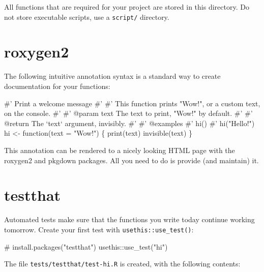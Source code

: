 \documentclass[]{book}
\newenvironment{Shaded}{}{}
\newcommand{\CommentTok}[1]{\textcolor[rgb]{0.00,0.50,0.00}{#1}}
\newcommand{\ControlFlowTok}[1]{\textcolor[rgb]{0.00,0.00,1.00}{#1}}
\newcommand{\DataTypeTok}[1]{#1}
\newcommand{\KeywordTok}[1]{\textcolor[rgb]{0.00,0.00,1.00}{#1}}
\newcommand{\NormalTok}[1]{#1}
\newcommand{\OperatorTok}[1]{#1}
\newcommand{\StringTok}[1]{\textcolor[rgb]{0.00,0.50,0.50}{#1}}
\begin{document}
All functions that are required for your project are stored in this directory.
Do not store executable scripts, use a \texttt{script/} directory.

\hypertarget{roxygen2}{%
\section{roxygen2}\label{roxygen2}}

The following intuitive annotation syntax is a standard way to create documentation for your functions:

\begin{Shaded}
\begin{Highlighting}[]
\CommentTok{#' Print a welcome message}
\CommentTok{#' }
\CommentTok{#' This function prints "Wow!", or a custom text, on the console.}
\CommentTok{#'}
\CommentTok{#' @param text The text to print, "Wow!" by default.}
\CommentTok{#' }
\CommentTok{#' @return The `text` argument, invisibly.}
\CommentTok{#' }
\CommentTok{#' @examples}
\CommentTok{#' hi()}
\CommentTok{#' hi("Hello!")}
\NormalTok{hi <-}\StringTok{ }\ControlFlowTok{function}\NormalTok{(}\DataTypeTok{text =} \StringTok{"Wow!"}\NormalTok{) \{}
  \KeywordTok{print}\NormalTok{(text)}
  \KeywordTok{invisible}\NormalTok{(text)}
\NormalTok{\}}
\end{Highlighting}
\end{Shaded}

This annotation can be rendered to a nicely looking HTML page with the roxygen2 and pkgdown packages.
All you need to do is provide (and maintain) it.

\hypertarget{testthat}{%
\section{testthat}\label{testthat}}

Automated tests make sure that the functions you write today continue working tomorrow.
Create your first test with \texttt{usethis::use\_test()}:

\begin{Shaded}
\begin{Highlighting}[]
\CommentTok{# install.packages("testthat")}
\NormalTok{usethis}\OperatorTok{::}\KeywordTok{use_test}\NormalTok{(}\StringTok{"hi"}\NormalTok{)}
\end{Highlighting}
\end{Shaded}

The file \texttt{tests/testthat/test-hi.R} is created, with the following contents:
\end{document}
